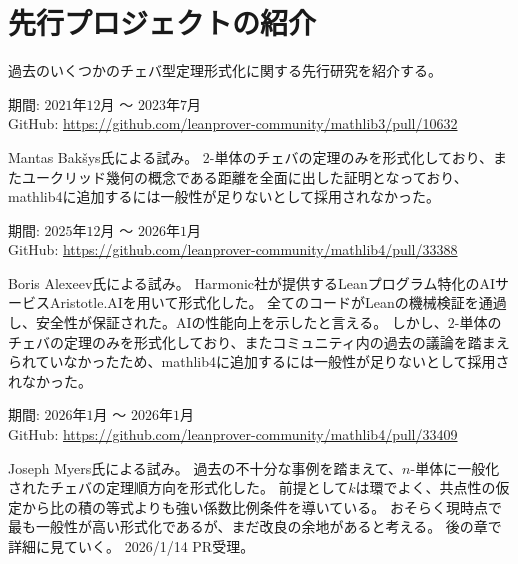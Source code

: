 \documentclass[a4paper,12pt]{bxjsbook}
\newlength{\customindent}
\newenvironment{body}{
  \par
  \begingroup
  \setlength{\leftskip}{\customindent}
  \setlength{\rightskip}{0pt}
  \setlength{\parindent}{1em}
  \setlength{\displayindent}{\customindent}
  \setlength{\displaywidth}{\dimexpr\linewidth-\customindent\relax}
}{
  \par
  \endgroup
}
\theoremstyle{theorem}
\begin{document}
    \section{先行プロジェクトの紹介}
    \begin{body}
        \indent 過去のいくつかのチェバ型定理形式化に関する先行研究を紹介する。

        \begin{bodydescription}
            \item[\hspace*{1.5em}・Lean3時代の形式化]
            期間: $2021$年$12$月 〜 $2023$年$7$月\\
            GitHub: \url{https://github.com/leanprover-community/mathlib3/pull/10632} \cite{mathlib3_ceva}

            Mantas Bakšys氏による試み。
            $2$-単体のチェバの定理のみを形式化しており、またユークリッド幾何の概念である距離を全面に出した証明となっており、mathlib4に追加するには一般性が足りないとして採用されなかった。

            \item[\hspace*{1.5em}・Aristotle.AI（Harmonic社）を用いた形式化]
            期間: $2025$年$12$月 〜 $2026$年$1$月\\
            GitHub: \url{https://github.com/leanprover-community/mathlib4/pull/33388} \cite{mathlib4_ceva_alexeev}

            Boris Alexeev氏による試み。
            Harmonic社が提供するLeanプログラム特化のAIサービスAristotle.AIを用いて形式化した。
            全てのコードがLeanの機械検証を通過し、安全性が保証された。AIの性能向上を示したと言える。
            しかし、$2$-単体のチェバの定理のみを形式化しており、またコミュニティ内の過去の議論を踏まえられていなかったため、mathlib4に追加するには一般性が足りないとして採用されなかった。

            \item[\hspace*{1.5em}・$n$-単体で汎用一般化された初の形式化]
            期間: $2026$年$1$月 〜 $2026$年$1$月\\
            GitHub: \url{https://github.com/leanprover-community/mathlib4/pull/33409} \cite{mathlib4_ceva_myers}

            Joseph Myers氏による試み。
            過去の不十分な事例を踏まえて、$n$-単体に一般化されたチェバの定理順方向を形式化した。
            前提として$k$は環でよく、共点性の仮定から比の積の等式よりも強い係数比例条件を導いている。
            おそらく現時点で最も一般性が高い形式化であるが、まだ改良の余地があると考える。
            後の章で詳細に見ていく。
            2026/1/14 PR受理。
        \end{bodydescription}

    \end{body}
\end{document}
